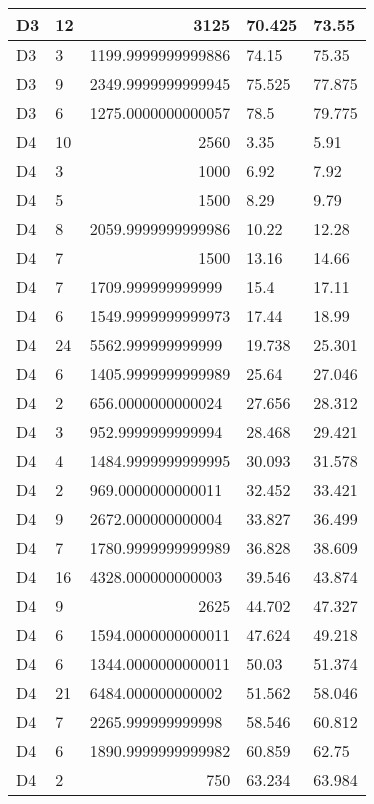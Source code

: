 \begin{longtable}{|l|l|l|l|l|}
D3 & 12 & \multicolumn{1}{r|}{3125} & 70.425 & 73.55 \\ \hline
D3 & 3 & 1199.9999999999886 & 74.15 & 75.35 \\ \hline
D3 & 9 & 2349.9999999999945 & 75.525 & 77.875 \\ \hline
D3 & 6 & 1275.0000000000057 & 78.5 & 79.775 \\ \hline
D4 & 10 & \multicolumn{1}{r|}{2560} & 3.35 & 5.91 \\ \hline
D4 & 3 & \multicolumn{1}{r|}{1000} & 6.92 & 7.92 \\ \hline
D4 & 5 & \multicolumn{1}{r|}{1500} & 8.29 & 9.79 \\ \hline
D4 & 8 & 2059.9999999999986 & 10.22 & 12.28 \\ \hline
D4 & 7 & \multicolumn{1}{r|}{1500} & 13.16 & 14.66 \\ \hline
D4 & 7 & 1709.999999999999 & 15.4 & 17.11 \\ \hline
D4 & 6 & 1549.9999999999973 & 17.44 & 18.99 \\ \hline
D4 & 24 & 5562.999999999999 & 19.738 & 25.301 \\ \hline
D4 & 6 & 1405.9999999999989 & 25.64 & 27.046 \\ \hline
D4 & 2 & 656.0000000000024 & 27.656 & 28.312 \\ \hline
D4 & 3 & 952.9999999999994 & 28.468 & 29.421 \\ \hline
D4 & 4 & 1484.9999999999995 & 30.093 & 31.578 \\ \hline
D4 & 2 & 969.0000000000011 & 32.452 & 33.421 \\ \hline
D4 & 9 & 2672.000000000004 & 33.827 & 36.499 \\ \hline
D4 & 7 & 1780.9999999999989 & 36.828 & 38.609 \\ \hline
D4 & 16 & 4328.000000000003 & 39.546 & 43.874 \\ \hline
D4 & 9 & \multicolumn{1}{r|}{2625} & 44.702 & 47.327 \\ \hline
D4 & 6 & 1594.0000000000011 & 47.624 & 49.218 \\ \hline
D4 & 6 & 1344.0000000000011 & 50.03 & 51.374 \\ \hline
D4 & 21 & 6484.000000000002 & 51.562 & 58.046 \\ \hline
D4 & 7 & 2265.999999999998 & 58.546 & 60.812 \\ \hline
D4 & 6 & 1890.9999999999982 & 60.859 & 62.75 \\ \hline
D4 & 2 & \multicolumn{1}{r|}{750} & 63.234 & 63.984 \\ \hline

\end{longtable}
